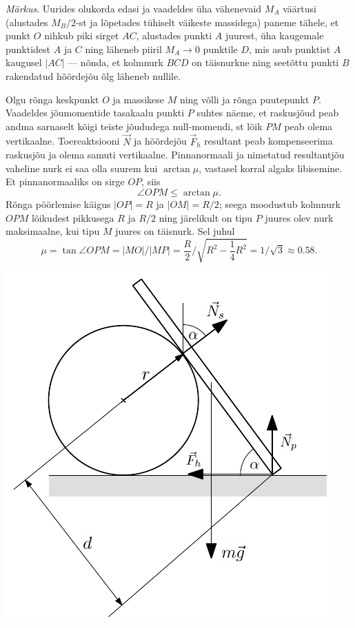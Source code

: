 \documentclass[10pt]{article}
\begin{document}
{\emph{Märkus}. Uurides olukorda edasi ja vaadeldes üha vähenevaid $M_A$ väärtusi (alustades $M_B/2$-st ja lõpetades tühiselt väikeste massidega) paneme tähele, et punkt $O$ nihkub piki sirget $AC$, alustades punkti $A$ juurest, üha kaugemale punktidest $A$ ja $C$ ning läheneb piiril $M_A \rightarrow 0$ punktile $D$, mis asub punktist $A$ kaugusel $|AC|$ --- nõnda, et kolmnurk $BCD$ on täisnurkne ning seetõttu punkti $B$ rakendatud hõõrdejõu õlg läheneb nullile.
\probend
\bigskip


\solu
Olgu rõnga keskpunkt $O$ ja massikese $M$ ning võlli ja rõnga puutepunkt $P$. Vaadeldes jõumomentide tasakaalu punkti $P$ suhtes näeme, et raskusjõud peab andma
sarnaselt kõigi teiste jõududega null-momendi, st lõik $PM$ peab olema vertikaalne.
Toereaktsiooni $\vec N$ ja hõõrdejõu $\vec F_h$ resultant peab kompenseerima raskusjõu ja olema samuti vertikaalne. Pinnanormaali ja nimetatud resultantjõu vaheline nurk ei
saa olla suurem kui $\arctan\mu$, vastasel korral algaks libisemine. Et pinnanormaaliks on sirge $OP$, siis
\[
\angle O P M \leq \arctan \mu.
\]
Rõnga pöörlemise käigus $|OP| = R$ ja $|OM| = R/2$; seega moodustub kolmnurk
$OPM$ lõikudest pikkusega $R$ ja $R/2$ ning järelikult on tipu $P$ juures olev nurk
maksimaalne, kui tipu $M$ juures on täisnurk. Sel juhul
\[
\mu=\tan \angle O P M=|M O| /|M P|=\frac{R}{2} / \sqrt{R^{2}-\frac{1}{4} R^{2}}=1 / \sqrt{3} \approx \num{0,58}.
\]
\probend
\bigskip


\solu
\begin{center}
	\includegraphics[width=0.7\linewidth]{2008-v3g-09-lah1.pdf}
\end{center}

}
\end{document}
